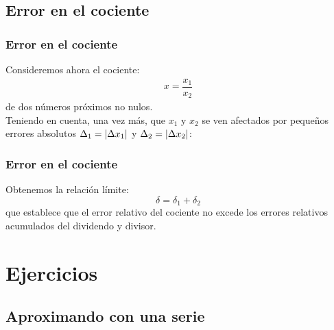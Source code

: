 \documentclass[12pt]{beamer}
\begin{document}
\subsection{Error en el cociente}

\begin{frame}
\frametitle{Error en el cociente}
Consideremos ahora el cociente:
\begin{align*}
x = \dfrac{x_{1}}{x_{2}}
\end{align*}
de dos números próximos no nulos.
\\
\bigskip
\pause
Teniendo en cuenta, una vez más, que $x_{1}$ y $x_{2}$ se ven afectados por pequeños errores absolutos $\Delta_{1} = \abs{\Delta x_{1}}$ y $\Delta_{2} = \abs{\Delta x_{2}}$:
\end{frame}
\begin{frame}
\frametitle{Error en el cociente}
Obtenemos la relación límite:
\pause
\begin{equation}
\delta = \delta_{1} + \delta_{2}
\label{eq:ecuacion_01_27}
\end{equation}
que establece que el error relativo del cociente no excede los errores relativos acumulados del dividendo y divisor.
\end{frame}

\section{Ejercicios}
\subsection{Aproximando con una serie}
\end{document}
